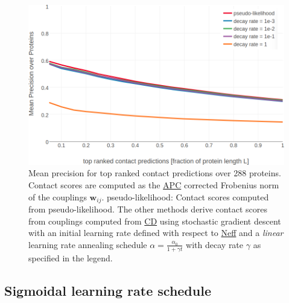 \documentclass[11pt,a4paper,twoside]{book}
\newcommand{\wij}{\mathbf{w}_{ij}}
\theoremstyle{definition}
\theoremstyle{definition}
\theoremstyle{remark}
\begin{document}
\begin{figure}

{\centering \includegraphics[width=1\linewidth]{img/full_likelihood/appendix/precision_vs_rank_alpha0_0_lin_decayrate} 

}

\caption{Mean precision for top ranked
contact predictions over 288 proteins. Contact scores are computed as
the \protect\hyperlink{abbrev}{APC} corrected Frobenius norm of the
couplings \(\wij\). pseudo-likelihood: Contact scores computed from
pseudo-likelihood. The other methods derive contact scores from
couplings computed from \protect\hyperlink{abbrev}{CD} using stochastic
gradient descent with an initial learning rate defined with respect to
\protect\hyperlink{abbrev}{Neff} and a \emph{linear} learning rate
annealing schedule \(\alpha = \frac{\alpha_0}{1 + \gamma t}\) with decay
rate \(\gamma\) as specified in the legend.}\label{fig:performance-cd-linschedule}
\end{figure}

\subsection{Sigmoidal learning rate
schedule}\label{sigmoidal-learning-rate-schedule}
\end{document}
